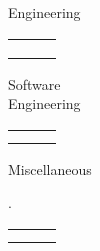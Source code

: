 

\flushleft \begin{minipage}[t]{\dateColWidth}
Engineering
\end{minipage}
\begin{minipage}[t]{0.8\textwidth}
	\begin{tabular}{ C{\skillsColWidth} C{\skillsColWidth} C{\skillsColWidth} }
		 &
		 &
		 \\
		 &
		 &
		 \\
	\end{tabular}
\end{minipage}

\divLine

\flushleft \begin{minipage}[t]{\dateColWidth}
Software \\
Engineering
\end{minipage}
\begin{minipage}[t]{0.8\textwidth}
	\begin{tabular}{ C{\skillsColWidth} C{\skillsColWidth} C{\skillsColWidth} }
		 &
		 &
		 \\
		 &
		 & 
	\end{tabular}
\end{minipage}

\divLine

\flushleft \begin{minipage}[t]{\dateColWidth}
Miscellaneous
\end{minipage}
\begin{minipage}[t]{0.8\textwidth}.
	\begin{tabular}{ C{\skillsColWidth} C{\skillsColWidth} C{\skillsColWidth} }
		 &
		 &
		 \\
		 &
	\end{tabular}
\end{minipage}








